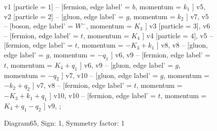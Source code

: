 \documentclass{revtex4}
\begin{document}
\begin{figure}[!htb]
\begin{center}
{    %
v1 [particle = \(1\)] -- [fermion, edge label' = \(b\), momentum = \(k_{1}\) ] v5, 
v2 [particle = \(2\)] -- [gluon, edge label' = \(g\), momentum = \(k_{2}\) ] v7, 
v5 -- [boson, edge label' = \(W^{-}\), momentum = \(K_{3}\) ] v3 [particle = \(3\)], 
v6 -- [fermion, edge label' = \(t\), momentum = \(K_{4}\) ] v4 [particle = \(4\)], 
v5 -- [fermion, edge label' = \(t\), momentum = \(-K_{3} + k_{1}\) ] v8, 
v8 -- [gluon, edge label' = \(g\), momentum = \(-q_{1}\) ] v6, 
v9 -- [fermion, edge label' = \(t\), momentum = \(K_{4} + q_{1}\) ] v6, 
v9 -- [gluon, edge label' = \(g\), momentum = \(-q_{2}\) ] v7, 
v10 -- [gluon, edge label' = \(g\), momentum = \(-k_{2} + q_{2}\) ] v7, 
v8 -- [fermion, edge label' = \(t\), momentum = \(-K_{3} + k_{1} + q_{1}\) ] v10, 
v10 -- [fermion, edge label' = \(t\), momentum = \(K_{4} + q_{1} - q_{2}\) ] v9, 
};
\end{center}
\caption{Diagram65, Sign: 1, Symmetry factor: 1}
\end{figure}
\newpage
\end{document}
